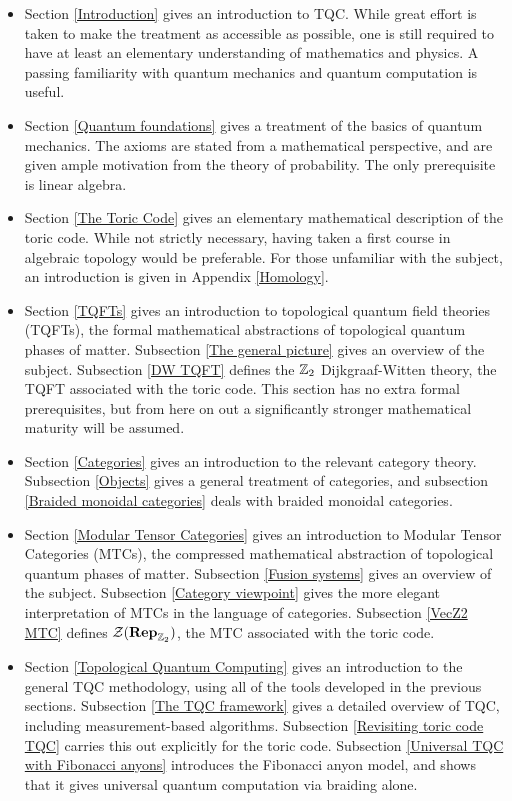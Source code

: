 \documentclass{article}
\theoremstyle{definition}
\numberwithin{figure}{section}
\begin{document}
\begin{itemize}
\item Section \ref{Introduction} gives an introduction to TQC. While great effort is taken to make the treatment as accessible as possible, one is still required to have at least an elementary understanding of mathematics and physics. A passing familiarity with quantum mechanics and quantum computation is useful.

\item Section \ref{Quantum foundations} gives a treatment of the basics of quantum mechanics. The axioms are stated from a mathematical perspective, and are given ample motivation from the theory of probability. The only prerequisite is linear algebra.

\item Section \ref{The Toric Code} gives an elementary mathematical description of the toric code. While not strictly necessary, having taken a first course in algebraic topology would be preferable. For those unfamiliar with the subject, an introduction is given in Appendix \ref{Homology}. 

\item Section \ref{TQFTs} gives an introduction to topological quantum field theories (TQFTs), the formal mathematical abstractions of topological quantum phases of matter. Subsection \ref{The general picture} gives an overview of the subject. Subsection \ref{DW TQFT} defines the $\mathbb{Z}_2$ Dijkgraaf-Witten theory, the TQFT associated with the toric code. This section has no extra formal prerequisites, but from here on out a significantly stronger mathematical maturity will be assumed.

\item Section \ref{Categories} gives an introduction to the relevant category theory. Subsection \ref{Objects} gives a general treatment of categories, and subsection \ref{Braided monoidal categories} deals with braided monoidal categories.

\item Section \ref{Modular Tensor Categories} gives an introduction to Modular Tensor Categories (MTCs), the compressed mathematical abstraction of topological quantum phases of matter. Subsection \ref{Fusion systems} gives an overview of the subject. Subsection \ref{Category viewpoint} gives the more elegant interpretation of MTCs in the language of categories. Subsection \ref{VecZ2 MTC} defines $\mathcal{Z}(\bold{Rep}_{\mathbb{Z}_2})$, the MTC associated with the toric code.

\item Section \ref{Topological Quantum Computing} gives an introduction to the general TQC methodology, using all of the tools developed in the previous sections. Subsection \ref{The TQC framework} gives a detailed overview of TQC, including measurement-based algorithms. Subsection \ref{Revisiting toric code TQC} carries this out explicitly for the toric code. Subsection \ref{Universal TQC with Fibonacci anyons} introduces the Fibonacci anyon model, and shows that it gives universal quantum computation via braiding alone.

\end{itemize}
\end{document}
